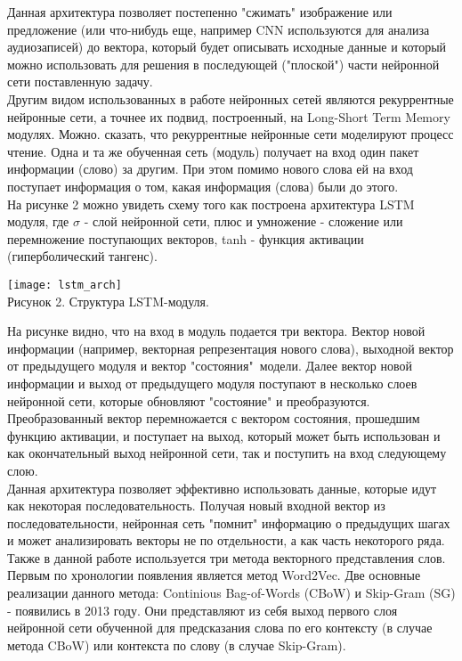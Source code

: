 \documentclass[a4paper,14pt]{article}
\begin{document}
\begin{justify}
\indent
Данная архитектура позволяет постепенно "сжимать" изображение или предложение (или что-нибудь еще, например CNN используются для анализа аудиозаписей) до вектора, который будет описывать исходные данные и который можно использовать для решения в последующей ("плоской") части нейронной сети поставленную задачу. \\
\indent
Другим видом использованных в работе нейронных сетей являются рекуррентные нейронные сети, а точнее их подвид, построенный, на Long-Short Term Memory модулях. Можно. сказать, что рекуррентные нейронные сети моделируют процесс чтение. Одна и та же обученная сеть (модуль) получает на вход один пакет информации (слово) за другим. При этом помимо нового слова ей на вход поступает информация о том, какая информация (слова) были до этого. \\
\indent
На рисунке 2 можно увидеть схему того как построена архитектура LSTM модуля, где $\sigma$ - слой нейронной сети, плюс и умножение - сложение или перемножение поступающих векторов, tanh - функция активации (гиперболический тангенс).
\begin{center}
	\texttt{[image: lstm\_arch]}\\
	Рисунок 2. Структура LSTM-модуля.
\end{center}
На рисунке видно, что на вход в модуль подается три вектора. Вектор новой информации (например, векторная репрезентация нового слова), выходной вектор от предыдущего модуля и вектор "состояния"\ модели. Далее вектор новой информации и выход от предыдущего модуля поступают в несколько слоев нейронной сети, которые обновляют "состояние" и преобразуются. Преобразованный вектор перемножается с вектором состояния, прошедшим функцию активации, и поступает на выход, который может быть использован и как окончательный выход нейронной сети, так и поступить на вход следующему слою. \cite{lstm} \\
\indent 
Данная архитектура позволяет эффективно использовать данные, которые идут как некоторая последовательность. Получая новый входной вектор из последовательности, нейронная сеть "помнит" информацию о предыдущих шагах и может анализировать векторы не по отдельности, а как часть некоторого ряда. \\
\indent 
Также в данной работе используется три метода векторного представления слов.\\
\indent
Первым по хронологии появления является метод Word2Vec. Две основные реализации данного метода:  Continious Bag-of-Words (CBoW) и Skip-Gram (SG) - появились в 2013 году. Они представляют из себя выход первого слоя нейронной сети обученной для предсказания слова по его контексту (в случае метода CBoW) или контекста по слову (в случае Skip-Gram). \cite{survey-emb} \\

\end{justify}
\end{document}
